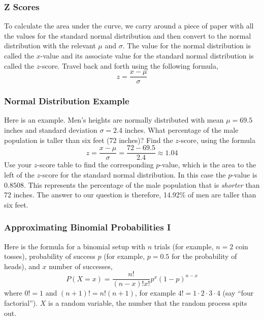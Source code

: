 \documentclass[xcolor=dvipsnames]{beamer}
\begin{document}
\begin{frame}
  \frametitle{Z Scores}
To calculate the area under the curve, we carry around a piece of
paper with all the values for the \alert{standard normal distribution}
and then convert to the normal distribution with the relevant $\mu$
and $\sigma$. The value for the normal distribution is called the
\alert{$x$-value} and its associate value for the standard normal distribution
is called the \alert{$z$-score}. Travel back and forth using the following
formula,
\begin{equation}
  \label{eq:uotoogoo}
  z=\frac{x-\mu}{\sigma}
\end{equation}
\end{frame}

\begin{frame}
  \frametitle{Normal Distribution Example}
Here is an example. Men's heights are normally distributed with mean
$\mu=69.5$ inches and standard deviation $\sigma=2.4$ inches. What
percentage of the male population is taller than six feet (72 inches)?
Find the $z$-score, using the formula
\begin{equation}
  \label{eq:igutheib}
  z=\frac{x-\mu}{\sigma}=\frac{72-69.5}{2.4}\approx{}1.04
\end{equation}
Use your $z$-score table to find the corresponding \alert{$p$-value},
which is the area to the left of the $z$-score for the standard normal
distribution. In this case the $p$-value is $0.8508$. This represents
the percentage of the male population that is \emph{shorter} than 72
inches. The answer to our question is therefore, 14.92\% of men are
taller than six feet.
\end{frame}

\begin{frame}
  \frametitle{Approximating Binomial Probabilities I}
Here is the formula for a \alert{binomial} setup with $n$ trials (for example,
$n=2$ coin tosses), probability of success $p$ (for example, $p=0.5$ for the
probability of heads), and $x$ number of successes,
\begin{equation}
  \label{eq:iedohdah}
  P(X=x)=\frac{n!}{(n-x)!x!}p^{x}(1-p)^{n-x}
\end{equation}
where $0!=1$ and $(n+1)!=n!(n+1)$, for example
$4!=1\cdot{}2\cdot{}3\cdot{}4$ (say ``four factorial''). $X$ is a
\alert{random variable}, the number that the random process spits out.
\end{frame}
\end{document}
